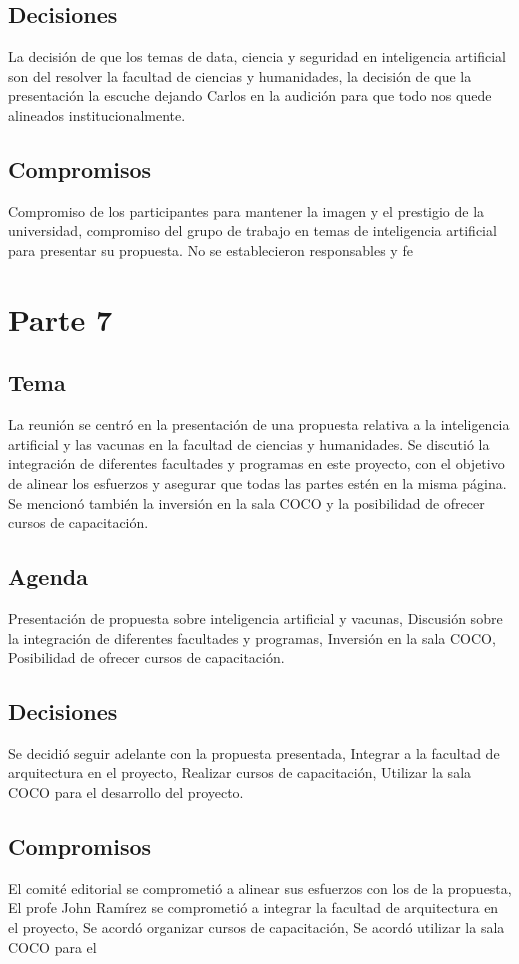 \documentclass{article}
\begin{document}
\subsection{Decisiones}
La decisión de que los temas de data, ciencia y seguridad en inteligencia artificial son del resolver la facultad de ciencias y humanidades, la decisión de que la presentación la escuche dejando Carlos en la audición para que todo nos quede alineados institucionalmente.

\subsection{Compromisos}
Compromiso de los participantes para mantener la imagen y el prestigio de la universidad, compromiso del grupo de trabajo en temas de inteligencia artificial para presentar su propuesta. No se establecieron responsables y fe
\section{Parte 7}
\subsection{Tema}
La reunión se centró en la presentación de una propuesta relativa a la inteligencia artificial y las vacunas en la facultad de ciencias y humanidades. Se discutió la integración de diferentes facultades y programas en este proyecto, con el objetivo de alinear los esfuerzos y asegurar que todas las partes estén en la misma página. Se mencionó también la inversión en la sala COCO y la posibilidad de ofrecer cursos de capacitación.

\subsection{Agenda}
Presentación de propuesta sobre inteligencia artificial y vacunas, Discusión sobre la integración de diferentes facultades y programas, Inversión en la sala COCO, Posibilidad de ofrecer cursos de capacitación.

\subsection{Decisiones}
Se decidió seguir adelante con la propuesta presentada, Integrar a la facultad de arquitectura en el proyecto, Realizar cursos de capacitación, Utilizar la sala COCO para el desarrollo del proyecto.

\subsection{Compromisos}
El comité editorial se comprometió a alinear sus esfuerzos con los de la propuesta, El profe John Ramírez se comprometió a integrar la facultad de arquitectura en el proyecto, Se acordó organizar cursos de capacitación, Se acordó utilizar la sala COCO para el
\end{document}
